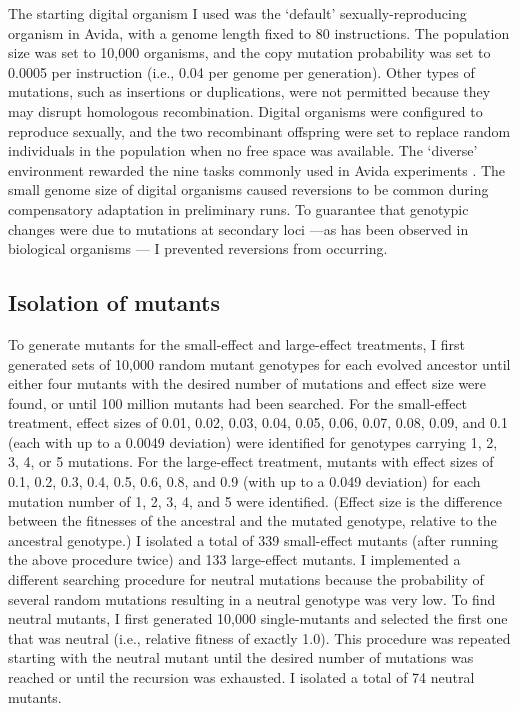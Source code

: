 \begin{doublespace}
The starting digital organism I used was the `default' sexually-reproducing
organism in Avida, with a genome length fixed to 80 instructions.
%
The population size was set to 10,000 organisms,
and the copy mutation probability was set to 0.0005 per instruction
(i.e., 0.04 per genome per generation).
%
Other types of mutations, such as insertions or duplications,
were not permitted because they may disrupt homologous recombination.
%
Digital organisms were configured to reproduce sexually,
and the two recombinant offspring were set to replace random individuals
in the population when no free space was available.
%
The `diverse' environment rewarded the nine tasks
commonly used in Avida experiments \citep{len03}.
%
The small genome size of digital organisms caused reversions
to be common during compensatory adaptation in preliminary runs.
%
To guarantee that genotypic changes were due to mutations at secondary loci%
---as has been observed in biological organisms \citep{bur99,est11}---%
I prevented reversions from occurring.



\subsection{Isolation of mutants}

To generate mutants for the small-effect and large-effect treatments,
I first generated sets of 10,000 random mutant genotypes
for each evolved ancestor until either four mutants
with the desired number of mutations and effect size were found,
or until 100 million mutants had been searched.
%
For the small-effect treatment, effect sizes of
0.01, 0.02, 0.03, 0.04, 0.05, 0.06, 0.07, 0.08, 0.09, and 0.1
(each with up to a 0.0049 deviation) were identified for genotypes carrying
1, 2, 3, 4, or 5 mutations.
%
For the large-effect treatment, mutants with effect sizes of
0.1, 0.2, 0.3, 0.4, 0.5, 0.6, 0.8, and 0.9 (with up to a 0.049 deviation)
for each mutation number of 1, 2, 3, 4, and 5 were identified.
%
(Effect size is the difference between
the fitnesses of the ancestral and the mutated genotype,
relative to the ancestral genotype.)
%
I isolated a total of 339 small-effect mutants
(after running the above procedure twice) and 133 large-effect mutants.
%
I implemented a different searching procedure for neutral mutations
because the probability of several random mutations resulting
in a neutral genotype was very low.
%
To find neutral mutants, I first generated 10,000 single-mutants
and selected the first one that was neutral
(i.e., relative fitness of exactly 1.0).
%
This procedure was repeated starting with the neutral mutant until
the desired number of mutations was reached or until the
recursion was exhausted.
%
I isolated a total of 74 neutral mutants.




\end{doublespace}
